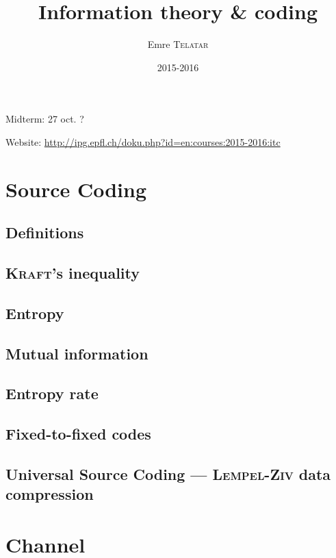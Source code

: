 

\title{Information theory \& coding}
\author{Emre \textsc{Telatar}}
\date{2015-2016}


\maketitle
\tableofcontents

\newpage

Midterm: 27 oct. ?

Website: \url{http://ipg.epfl.ch/doku.php?id=en:courses:2015-2016:itc}

\chapter{Source Coding}
    \section{Definitions}
        
    \section{\textsc{Kraft}'s inequality}
        
    \section{Entropy}
        
    \section{Mutual information}
        
    \section{Entropy rate}
        
    \section{Fixed-to-fixed codes}
        
    \section[Universal Source Coding]{Universal Source Coding \---- \textsc{Lempel}-\textsc{Ziv} data compression}
        

\chapter{Channel}
    



\nocite{*}







